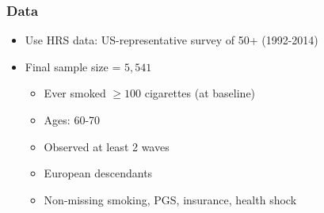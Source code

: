 \documentclass[10pt,compress,xcolor=dvipsnames]{beamer}    %
\newcommand{\1}[1]{\mathrm{1\hspace*{-2.5pt}l}[#1]}	%
\begin{document}
\begin{frame}\label{frame:data}
\frametitle{Data}%

\begin{itemize}
	\item Use HRS data: US-representative survey of 50+ (1992-2014)
	\item Final sample size = $5,541$
	\begin{itemize}
		\item Ever smoked $\geq 100$ cigarettes (at baseline)
		\item Ages: 60-70
		\item Observed at least 2 waves
		\item European descendants
		\item Non-missing smoking, PGS, insurance, health shock
	\end{itemize}
\end{itemize}

\end{frame}
\end{document}
